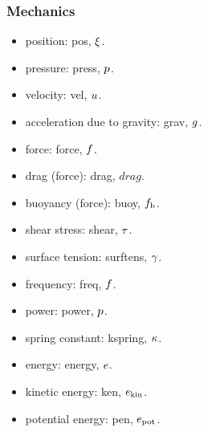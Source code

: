 \subsubsection{Mechanics}
\begin{itemize}
\item position: pos, $\xi$.
\item pressure: press, $p$.
\item velocity: vel, $u$.
\item acceleration due to gravity: grav, $g$.
\item force: force, $f$.
\item drag (force): drag, $drag$.
\item buoyancy (force): buoy, $f_\text{b}$.
\item shear stress: shear, $\tau$.
\item surface tension: surftens, $\gamma$.
\item frequency: freq, $f$.
\item power: power, $p$.
\item spring constant: kspring, $\kappa$.
\item energy: energy, $e$.
\item kinetic energy: ken, $e_\text{kin}$.
\item potential energy: pen, $e_\text{pot}$.
\end{itemize}


